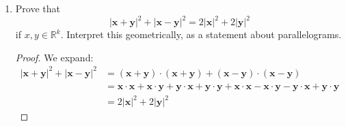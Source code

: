 \documentclass{scrbook}
\newcommand{\R}{\mathbb{R}}
\begin{document}
\begin{enumerate}
\begin{enumerate}[(a)]
\begin{proof} Let $\textbf{m} = \frac{1}{2} ( \textbf{x} + \textbf{y} )$. Without loss of generality, suppose $\textbf{y} = -\textbf{x}$, translating when necessary. Also, let $t = \sqrt{r^2 - d^2/4}$, which is well defined since $2r > d$. Then, the set of vectors on the hyperplane orthogonal to the line crossing $\textbf{x}$ and $\textbf{y}$ with distance $t$ to $\textbf{m}$ satisfy the required equation, and there are infinitely many.
\end{proof}

\item If $2r = d$, there is exactly one such $\textbf{z}$.

\begin{proof}
If such a $\textbf{z}$ existed, then $d = |\textbf{x} - \textbf{y}| \le |\textbf{x} - \textbf{z}| + |\textbf{z} - \textbf{y}| = 2r = d$, so equality must hold in the triangle inequality. This happens when the three points are co-linear, and there is a unique point which satisfies this, namely $\textbf{z} = \textbf{m}$ as defined above.
\end{proof}

\item If $2r < d$, there are no such $\textbf{z}$.
\begin{proof}
If such a $\textbf{z}$ existed, then $d = |\textbf{x} - \textbf{y}| \le |\textbf{x} - \textbf{z}| + |\textbf{z} - \textbf{y}| = 2r < d$, a contradiction.
\end{proof}
\end{enumerate}

How must these statements be modified if $k < 3$?

\begin{proof}
If $k = 2$, then (a) will have 2 solutions instead, and everything else remains the same. If $k = 1$, (a) will have no solutions.
\end{proof}

\item Prove that
\[
	|\textbf{x} + \textbf{y}|^2 + |\textbf{x} - \textbf{y}|^2 = 2 |\textbf{x}|^2 + 2 |\textbf{y}|^2
\]
if $x, y \in \R^k$. Interpret this geometrically, as a statement about parallelograms.

\begin{proof}
We expand:
\begin{align*}
|\textbf{x} + \textbf{y}|^2 + |\textbf{x} - \textbf{y}|^2 &= (\textbf{x} + \textbf{y}) \cdot (\textbf{x} + \textbf{y}) + (\textbf{x} - \textbf{y}) \cdot (\textbf{x} - \textbf{y}) \\
	&= \textbf{x} \cdot \textbf{x} + \textbf{x} \cdot \textbf{y} + \textbf{y} \cdot \textbf{x} + \textbf{y} \cdot \textbf{y} + \textbf{x} \cdot \textbf{x} - \textbf{x} \cdot \textbf{y} - \textbf{y} \cdot \textbf{x} + \textbf{y} \cdot \textbf{y} \\
	&= 2 |\textbf{x}|^2 + 2 |\textbf{y}|^2
\end{align*}


\end{proof}
\end{enumerate}
\end{document}

